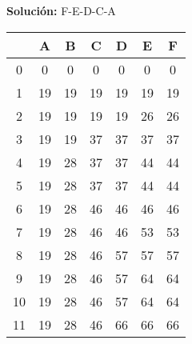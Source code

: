 \documentclass[a4paper]{article}
\begin{document}
\textbf{Solución:} F-E-D-C-A

\begin{table}[H]
\centering
\relax
\begin{tabular}{|c|c|c|c|c|c|c|}
\hline
 & A & B & C & D & E & F \\
\hline
0 & 0 \cellcolor{red!50} & 0 \cellcolor{red!50} & 0 \cellcolor{red!50} & 0 \cellcolor{red!50} & 0 \cellcolor{red!50} & 0 \cellcolor{red!50} \\
\hline
1 & 19 \cellcolor{green!50} & 19 \cellcolor{red!50} & 19 \cellcolor{red!50} & 19 \cellcolor{red!50} & 19 \cellcolor{red!50} & 19 \cellcolor{red!50} \\
\hline
2 & 19 \cellcolor{green!50} & 19 \cellcolor{red!50} & 19 \cellcolor{red!50} & 19 \cellcolor{red!50} & 26 \cellcolor{green!50} & 26 \cellcolor{red!50} \\
\hline
3 & 19 \cellcolor{green!50} & 19 \cellcolor{red!50} & 37 \cellcolor{green!50} & 37 \cellcolor{red!50} & 37 \cellcolor{red!50} & 37 \cellcolor{red!50} \\
\hline
4 & 19 \cellcolor{green!50} & 28 \cellcolor{green!50} & 37 \cellcolor{green!50} & 37 \cellcolor{red!50} & 44 \cellcolor{green!50} & 44 \cellcolor{red!50} \\
\hline
5 & 19 \cellcolor{green!50} & 28 \cellcolor{green!50} & 37 \cellcolor{green!50} & 37 \cellcolor{red!50} & 44 \cellcolor{green!50} & 44 \cellcolor{red!50} \\
\hline
6 & 19 \cellcolor{green!50} & 28 \cellcolor{green!50} & 46 \cellcolor{green!50} & 46 \cellcolor{red!50} & 46 \cellcolor{red!50} & 46 \cellcolor{red!50} \\
\hline
7 & 19 \cellcolor{green!50} & 28 \cellcolor{green!50} & 46 \cellcolor{green!50} & 46 \cellcolor{red!50} & 53 \cellcolor{green!50} & 53 \cellcolor{red!50} \\
\hline
8 & 19 \cellcolor{green!50} & 28 \cellcolor{green!50} & 46 \cellcolor{green!50} & 57 \cellcolor{green!50} & 57 \cellcolor{red!50} & 57 \cellcolor{red!50} \\
\hline
9 & 19 \cellcolor{green!50} & 28 \cellcolor{green!50} & 46 \cellcolor{green!50} & 57 \cellcolor{green!50} & 64 \cellcolor{green!50} & 64 \cellcolor{red!50} \\
\hline
10 & 19 \cellcolor{green!50} & 28 \cellcolor{green!50} & 46 \cellcolor{green!50} & 57 \cellcolor{green!50} & 64 \cellcolor{green!50} & 64 \cellcolor{red!50} \\
\hline
11 & 19 \cellcolor{green!50} & 28 \cellcolor{green!50} & 46 \cellcolor{green!50} & 66 \cellcolor{green!50} & 66 \cellcolor{red!50} & 66 \cellcolor{red!50} \\

\end{tabular}
\end{table}
\end{document}
